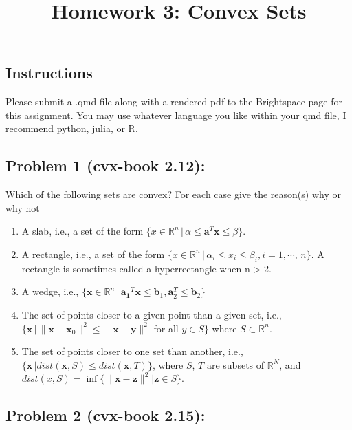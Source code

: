 \documentclass[
  letterpaper,
  DIV=11,
  numbers=noendperiod]{scrartcl}
\title{Homework 3: Convex Sets}
\author{}
\date{}
\providecommand{\tightlist}{%
  \setlength{\itemsep}{0pt}\setlength{\parskip}{0pt}}\usepackage{longtable,booktabs,array}
\begin{document}
\maketitle


\subsection{Instructions}\label{instructions}

Please submit a .qmd file along with a rendered pdf to the Brightspace
page for this assignment. You may use whatever language you like within
your qmd file, I recommend python, julia, or R.

\subsection{Problem 1 (cvx-book 2.12):}\label{problem-1-cvx-book-2.12}

Which of the following sets are convex? For each case give the reason(s)
why or why not

\begin{enumerate}
\def\labelenumi{\alph{enumi}.}
\tightlist
\item
  A slab, i.e., a set of the form
  \(\{x \in \mathbb{R}^n\, |\, \alpha \leq \mathbf{a}^T \mathbf{x} \leq{\beta}\}\).
\item
  A rectangle, i.e., a set of the form
  \(\{x \in \mathbb{R}^n\, |\, \alpha_i \leq x_i \leq \beta_i, i = 1,\cdots,\, n\}\).
  A rectangle is sometimes called a hyperrectangle when n \textgreater{}
  2.
\item
  A wedge, i.e.,
  \(\{ \mathbf{x} \in \mathbb{R}^n\, |\, \mathbf{a_1}^T\mathbf{x} \leq \mathbf{b}_1, \mathbf{a}_2^T\leq\mathbf{b}_2\}\)
\item
  The set of points closer to a given point than a given set, i.e.,
  \(\{ \mathbf{x}\, |\, \|\mathbf{x} − \mathbf{x}_0\|^2 \leq \|\mathbf{x} − \mathbf{y}\|^2\)
  for all \(y \in S\}\) where \(S \subset \mathbb{R}^n\).
\item
  The set of points closer to one set than another, i.e.,
  \(\{\mathbf{x}\, | dist(\mathbf{x}, S) \leq dist(\mathbf{x}, T )\}\),
  where \(S\), \(T\) are subsets of \(\mathbb{R}^N\), and
  \(dist(x, S) = \inf\{\|\mathbf{x}  − \mathbf{z}\|^2 | \mathbf{z} \in S\}\).
\end{enumerate}

\subsection{Problem 2 (cvx-book 2.15):}\label{problem-2-cvx-book-2.15}
\end{document}
